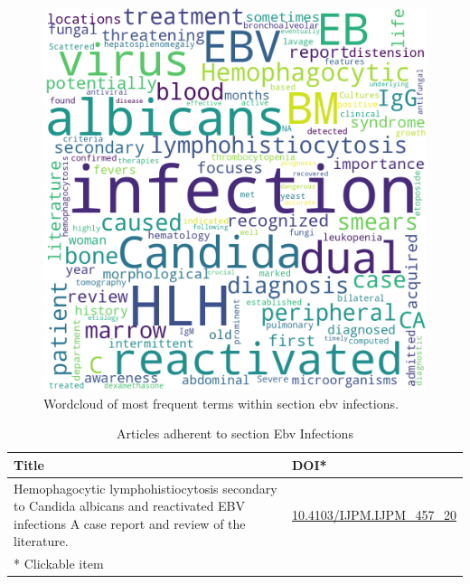 \documentclass{qqtarticle}
\begin{document}
        \begin{figure}[H]
            \centering
            \includegraphics[width=.75\linewidth]{img/ebvinfections.png}
            \caption{Wordcloud of most frequent terms within section ebv infections.}
            \label{fig:wcl_ebvinfections}
        \end{figure}

        \begin{table}[H]
            \scriptsize
            \centering
            \caption{Articles adherent to section Ebv Infections}
            \renewcommand{\arraystretch}{1.5}
            \begin{tabular}{p{}l}
                \toprule 
                Title & DOI* \\     \midrule Hemophagocytic lymphohistiocytosis secondary to Candida albicans and reactivated EBV infections  A case report and review of the literature. \cite{Hemophagoc4bb4a422} & \href{https://dx.doi.org/10.4103/IJPM.IJPM_457_20}{10.4103/IJPM.IJPM_457_20}\\     \midrule
                * Clickable item \\
                \bottomrule
            \end{tabular}
            \label{tab:topic5}
        \end{table}
    
\end{document}
